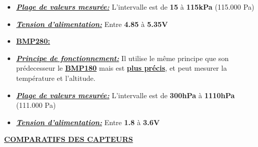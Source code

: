 \documentclass[a4paper,12pt]{report}
\begin{document}
\begin{itemize}
\vspace{2cm}
\setlength{\itemindent}{2cm}
\item \underline{\textit{\textbf{Plage de valeurs mesurée:}}} L'intervalle est de \textbf{15} à \textbf{115kPa} (115.000 Pa)
\end{itemize} 


\begin{itemize}
\setlength{\itemindent}{2cm}
\item \underline{\textit{\textbf{Tension d'alimentation:}}} Entre \textbf{4.85} à \textbf{5.35V} 
\end{itemize}

\vspace{5cm}

\begin{itemize}
\break
\setlength{\itemindent}{1cm}
 \item \underline{\textbf{BMP280:}}
\end{itemize}

\begin{itemize}

\setlength{\itemindent}{2cm}
\item \underline{\textit{\textbf{Principe de fonctionnement:}}} Il utilise le même principe que son prédecesseur le \underline{\textbf{BMP180}}
 mais est \underline{\textbf{ plus précis}}, et peut mesurer la température et l'altitude.
\end{itemize} 

\begin{itemize}
\setlength{\itemindent}{2cm}
\item \underline{\textit{\textbf{Plage de valeurs mesurée:}}} L'intervalle est de \textbf{300hPa} à \textbf{1110hPa} (111.000 Pa)
\end{itemize} 


\begin{itemize}
\setlength{\itemindent}{2cm}
\item \underline{\textit{\textbf{Tension d'alimentation:}}} Entre \textbf{1.8} à \textbf{3.6V} 
\end{itemize} 

\vspace{1.5cm}

\underline{\textbf{COMPARATIFS DES CAPTEURS}}
\end{document}
